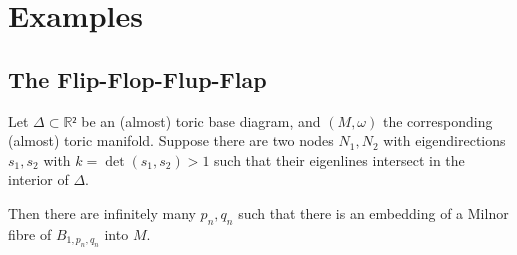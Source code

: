 \documentclass[12pt,a4paper,draft]{scrartcl}
\begin{document}
\section{Examples}

\subsection{The Flip-Flop-Flup-Flap}


\begin{proposition}
  Let $Δ ⊂ ℝ²$ be an (almost) toric base diagram, and $(M,ω)$ the corresponding (almost) toric manifold.
Suppose there are two nodes $N_1,N_2$ with eigendirections $s_1,s_2$ with $k = \det(s_1,s_2)>1$ such that their eigenlines intersect in the interior of $Δ$.

Then there are infinitely many $p_n,q_n$ such that there is an embedding of a Milnor fibre of $B_{1,p_n,q_n}$ into $M$.
\end{proposition}
\end{document}
